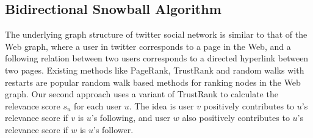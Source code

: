 \documentclass{article}
\begin{document}
\subsection{Bidirectional Snowball Algorithm}

The underlying graph structure of twitter social network is similar to that of the Web graph, where a user in twitter corresponds to a page in the Web, and a following relation between two users corresponds to a directed hyperlink between two pages. Existing methods like PageRank\cite{page1999pagerank}, TrustRank\cite{gyngyi2004combating} and random walks with restarts\cite{tong2006fast} are popular random walk based methods for ranking nodes in the Web graph. Our second approach uses a variant of TrustRank to calculate the relevance score $s_u$ for each user $u$. The idea is user $v$ positively contributes to $u$'s relevance score if $v$ is $u$'s following, and user $w$ also positively contributes to $u$'s relevance score if $w$ is $u$'s follower.


\end{document}
